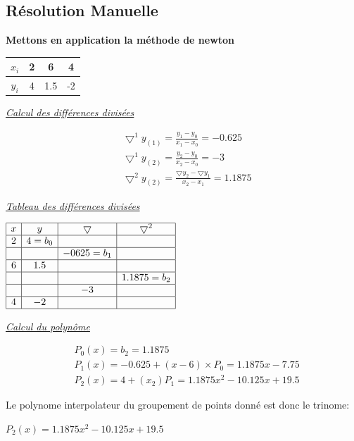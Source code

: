 \subsection{Résolution Manuelle}
\begin{center}
    \textbf{Mettons en application la méthode de newton}\vspace{6pt}\\
\begin{tabular}{|c|c|c|c|}
    \hline
    $x_i$ & 2 & 6 & 4 \\
    \hline
    $y_i$ & 4 & 1.5 & -2\\
    \hline
\end{tabular}
\end{center}
\underline{\textit{Calcul des différences divisées}}\\
\begin{center}
    \begin{align*}
     &\bigtriangledown^{1}y_{(1)} = \frac{y_1 - y_0}{x_1-x_0} = -0.625 \\
     &\bigtriangledown^{1}y_{(2)} = \frac{y_2 - y_0}{x_2-x_0} = -3 \\
     &\bigtriangledown^{2}y_{(2)} = \frac{\bigtriangledown y_2 - \bigtriangledown y_1}{x_2-x_1} = 1.1875
    \end{align*}
\end{center}
\underline{\textit{Tableau des différences divisées}}\\
\begin{center}
$
\begin{array}{|c|c|c|c|}
\hline
x & y & \bigtriangledown & \bigtriangledown^2 \\
\hline
2 & 4 = b_0 &  & \\
\hline
& & -0625= b_1 &  \\ 
\hline
6 & 1.5&  & \\
\hline
& & & 1.1875 = b_2 \\
\hline
& &-3 & \\
\hline
4& -2 & & \\
\hline
\end{array}
$
\end{center}
\underline{\textit{Calcul du polynôme}}\\
\begin{center}
    \begin{align*}
    &P_0 (x) = b_2 = 1.1875 \\
    &P_1(x) = -0.625 + (x-6) \times P_0 = 1.1875x - 7.75 \\
    &P_2(x) = 4+ (x_2 )P_1 = 1.1875x^2-10.125x+19.5 
    \end{align*}
\end{center}
Le polynome interpolateur du groupement de points donné est donc le trinome:
\begin{center}
    $P_2(x)=1.1875x^2-10.125x+19.5$\\
\end{center}
